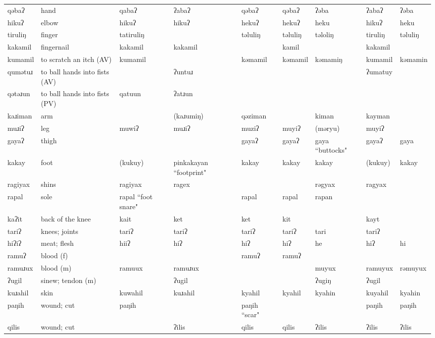 \begin{landscape}
\begin{longtable}{*{9}{>{\raggedright\arraybackslash}p{}}}
\text{*}qəbaʔ & hand & qabaʔ & ʔabaʔ & qəbaʔ & qəbaʔ & ʔəba & ʔabaʔ & ʔəba\\
\text{*}hikuʔ & elbow & hikuʔ & hikuʔ & hekuʔ & hekuʔ & heku & hikuʔ & heku\\
\text{*}tiruliŋ & finger & tatiruliŋ &  & təluliŋ & təluliŋ & təloliŋ & tiruliŋ & təluliŋ\\
\text{*}kakamil & fingernail & kakamil & kakamil &  & kamil &  & kakamil & \\
\text{*}kumamil & to scratch an itch (AV) & kumamil &  & kəmamil & kəmamil & kəmamiŋ & kumamil & kəmamin\\
\text{*}qumətuɹ & to ball hands into fists (AV) &  & ʔuntuɹ &  &  &  & ʔumatuy & \\
\text{*}qətəɹun & to ball hands into fists (PV) & qatuun & ʔatɹun &  &  &  &  & \\
\text{*}kaɹiman & arm &  & (kaɹumiŋ) & qəziman &  & kiman & kayman & \\
\text{*}muɹiʔ & leg & muwiʔ & muɹiʔ & muziʔ & muyiʔ & (məryu) & muyiʔ & \\
\text{*}gayaʔ & thigh &  &  & gayaʔ & gayaʔ & gaya ``buttocks" & gayaʔ & gaya\\
\text{*}kakay & foot & (kukuy) & pinkakayan ``footprint" & kakay & kakay & kakay & (kukuy) & kakay\\
\text{*}ragiyax & shins & ragiyax & ragex &  &  & rəgyax & ragyax & \\
\text{*}rapal & sole & rapal ``foot snare" &  & rapal & rapal & rapan &  & \\
\text{*}kaʔit & back of the knee & kait & ket & ket & kit &  & kayt & \\
\text{*}tariʔ & knees; joints & tariʔ & tariʔ & tariʔ & tariʔ & tari & tariʔ & \\
\text{*}hiʔiʔ & meat; flesh & hiiʔ & hiʔ & hiʔ & hiʔ & he & hiʔ & hi\\
\text{*}ramuʔ & blood (f) &  &  & ramuʔ & ramuʔ &  &  & \\
\text{*}ramuɹux & blood (m) & ramuux & ramuɹux &  &  & muyux & ramuyux & rəmuyux\\
\text{*}ʔugil & sinew; tendon (m) &  & ʔugil &  &  & ʔugiŋ & ʔugil & \\
\text{*}kuɹahil & skin & kuwahil & kuɹahil & kyahil & kyahil & kyahin & kuyahil & kyahin\\
\text{*}paŋih & wound; cut & paŋih &  & paŋih ``scar" &  &  & paŋih & paŋih\\
\text{*}qilis & wound; cut &  & ʔilis & qilis & qilis & ʔilis & ʔilis & ʔilis\\

\end{longtable}
\end{landscape}
